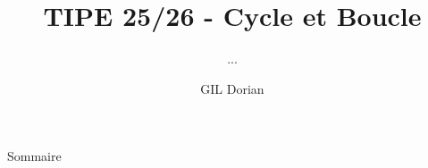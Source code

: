 \documentclass[pdf]{beamer}
\title{TIPE 25/26 - Cycle et Boucle}
\subtitle{...}
\author{GIL Dorian}
\date{}
\begin{document}
\begin{frame}
\titlepage
\end{frame}

\begin{frame}{Sommaire}

\end{frame}
\end{document}

